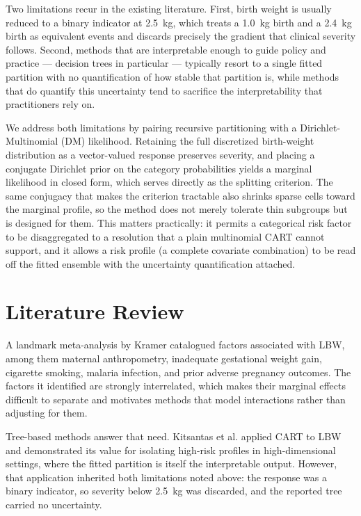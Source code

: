 \documentclass[AMA]{USG}
\begin{document}
Two limitations recur in the existing literature. First, birth weight is usually reduced to a binary indicator at 2.5~kg, which treats a 1.0~kg birth and a 2.4~kg birth as equivalent events and discards precisely the gradient that clinical severity follows. Second, methods that are interpretable enough to guide policy and practice --- decision trees in particular --- typically resort to a single fitted partition with no quantification of how stable that partition is, while methods that do quantify this uncertainty tend to sacrifice the interpretability that practitioners rely on. 

We address both limitations by pairing recursive partitioning with a Dirichlet-Multinomial (DM) likelihood. Retaining the full discretized birth-weight distribution as a vector-valued response preserves severity, and placing a conjugate Dirichlet prior on the category probabilities yields a marginal likelihood in closed form, which serves directly as the splitting criterion. The same conjugacy that makes the criterion tractable also shrinks sparse cells toward the marginal profile, so the method does not merely tolerate thin subgroups but is designed for them. This matters practically: it permits a categorical risk factor to be disaggregated to a resolution that a plain multinomial CART cannot support, and it allows a risk profile (a complete covariate combination) to be read off the fitted ensemble with the uncertainty quantification attached. 


\section{Literature Review}

A landmark meta-analysis by Kramer\cite{kramer1987} catalogued factors associated with LBW, among them maternal anthropometry, inadequate gestational weight gain, cigarette smoking, malaria infection, and prior adverse pregnancy outcomes. The factors it identified are strongly interrelated, which makes their marginal effects difficult to separate and motivates methods that model interactions rather than adjusting for them. 

Tree-based methods answer that need. Kitsantas et al.\cite{KITSANTAS2006275} applied CART to LBW and demonstrated its value for isolating high-risk profiles in high-dimensional settings, where the fitted partition is itself the interpretable output. However, that application inherited both limitations noted above: the response was a binary indicator, so severity below 2.5~kg was discarded, and the reported tree carried no uncertainty. 
\end{document}
